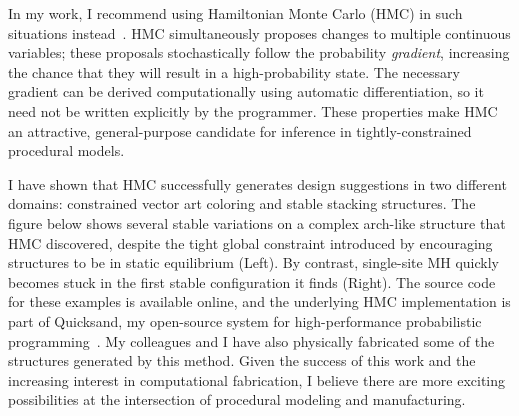 \documentclass[
10pt, %
a4paper, %
oneside, %
headinclude,footinclude, %
BCOR5mm, %
]{scrartcl}
\begin{document}
In my work, I recommend using Hamiltonian Monte Carlo (HMC) in such situations instead~\cite{GraphicsHMC}. HMC simultaneously proposes changes to multiple continuous variables; these proposals stochastically follow the probability \emph{gradient}, increasing the chance that they will result in a high-probability state. The necessary gradient can be derived computationally using automatic differentiation, so it need not be written explicitly by the programmer. These properties make HMC an attractive, general-purpose candidate for inference in tightly-constrained procedural models.

I have shown that HMC successfully generates design suggestions in two different domains: constrained vector art coloring and stable stacking structures. The figure below shows several stable variations on a complex arch-like structure that HMC discovered, despite the tight global constraint introduced by encouraging structures to be in static equilibrium (Left). By contrast, single-site MH quickly becomes stuck in the first stable configuration it finds (Right). The source code for these examples is available online, and the underlying HMC implementation is part of Quicksand, my open-source system for high-performance probabilistic programming~\cite{Quicksand}. My colleagues and I have also physically fabricated some of the structures generated by this method. Given the success of this work and the increasing interest in computational fabrication, I believe there are more exciting possibilities at the intersection of procedural modeling and manufacturing.
\end{document}
